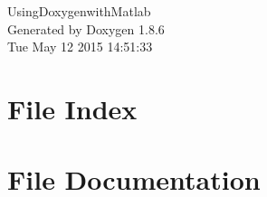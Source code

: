 \documentclass[twoside]{book}
\newcommand{\clearemptydoublepage}{%
  \newpage{\pagestyle{empty}\cleardoublepage}%
}
\begin{document}
\hypersetup{pageanchor=false}
\begin{titlepage}
\vspace*{7cm}
\begin{center}%
{\Large Using\-Doxygenwith\-Matlab }\\
\vspace*{1cm}
{\large Generated by Doxygen 1.8.6}\\
\vspace*{0.5cm}
{\small Tue May 12 2015 14:51:33}\\
\end{center}
\end{titlepage}
\clearemptydoublepage
\tableofcontents
\clearemptydoublepage
{}
\hypersetup{pageanchor=true}

\chapter{File Index}

\chapter{File Documentation}















































\newpage
{}
{}
\printindex
\end{document}
